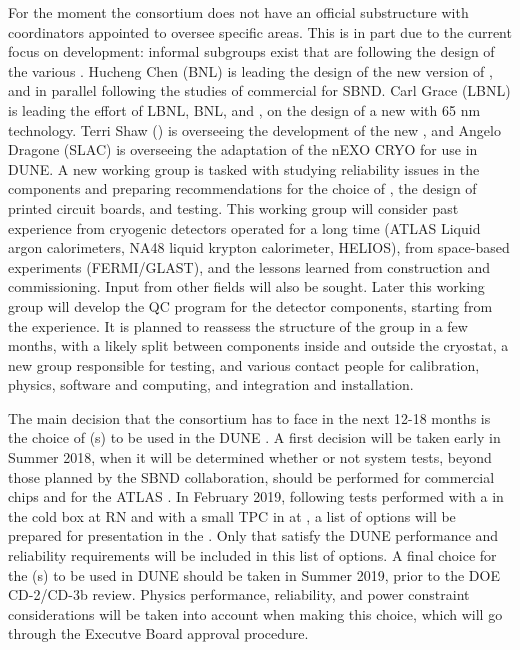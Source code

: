 For the moment the  consortium does not have an official substructure
with coordinators appointed to oversee specific areas. This is in part due
to the current focus on  development: informal subgroups exist that
are following the design of the various . Hucheng Chen (BNL) is leading the
design of the new version of , and in parallel following the studies
of commercial  for SBND. Carl Grace (LBNL) is leading the effort of
LBNL, BNL, and \fnal, on the design of a new   with 65 nm technology.
Terri Shaw (\fnal) is overseeing the development of the new  , and
Angelo Dragone (SLAC) is overseeing the adaptation of the nEXO CRYO 
for use in DUNE. A new working group is tasked with studying reliability
issues in the  components and preparing recommendations for the choice
of , the design of printed circuit boards, and testing. This working group
will consider past experience from cryogenic detectors operated for a long
time (ATLAS Liquid argon calorimeters, NA48 liquid krypton calorimeter, HELIOS),
from space-based experiments (FERMI/GLAST), and the lessons learned from
 construction and commissioning. Input from other fields will
also be sought. Later this working group will develop the QC program for the  detector
components, starting from the  experience. It is planned to
reassess the structure of the group in a few months, with a likely split
between components inside and outside the cryostat, a new group responsible
for testing, and various contact people for calibration, physics, software and
computing, and integration and installation.
 
The main decision that the consortium has to face in the next 12-18 months
is the choice of (s) to be used in the DUNE . A first decision will
be taken early in Summer 2018, when it will be determined whether or not system
tests, beyond those planned by the SBND collaboration, should be performed for 
commercial  chips and for the ATLAS . In February 2019, following tests
performed with a   in the cold box at RN and with a small TPC in
\lar at \fnal, a list of options will be prepared for presentation in the .
Only  that satisfy the DUNE performance and reliability requirements
will be included in this list of options. A final choice for the (s) to
be used in DUNE should be taken in Summer 2019, prior to the DOE CD-2/CD-3b
review. Physics performance, reliability, and power constraint considerations
will be taken into account when making this choice, which will go through
the Executve Board approval procedure.
